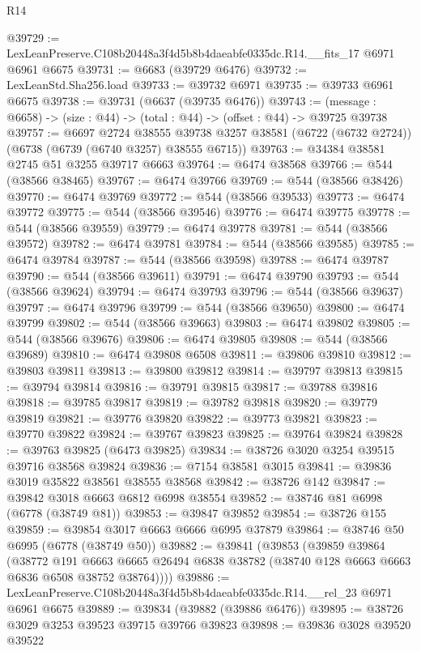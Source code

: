\begin{lexlean}{R14}
\begin{coremodule}
@39729 := LexLeanPreserve.C108b20448a3f4d5b8b4daeabfe0335dc.R14.__fits_17 @6971 @6961 @6675
@39731 := @6683 (@39729 @6476)
@39732 := LexLeanStd.Sha256.load
@39733 := @39732 @6971
@39735 := @39733 @6961 @6675
@39738 := @39731 (@6637 (@39735 @6476))
@39743 := (message : @6658) -> (size : @44) -> (total : @44) -> (offset : @44) -> @39725 @39738
@39757 := @6697
    @2724
    @38555
    @39738
    @3257
    @38581
    (@6722 (@6732 @2724))
    (@6738 (@6739 (@6740 @3257) @38555 @6715))
@39763 := @34384 @38581 @2745 @51 @3255 @39717 @6663
@39764 := @6474 @38568
@39766 := @544 (@38566 @38465)
@39767 := @6474 @39766
@39769 := @544 (@38566 @38426)
@39770 := @6474 @39769
@39772 := @544 (@38566 @39533)
@39773 := @6474 @39772
@39775 := @544 (@38566 @39546)
@39776 := @6474 @39775
@39778 := @544 (@38566 @39559)
@39779 := @6474 @39778
@39781 := @544 (@38566 @39572)
@39782 := @6474 @39781
@39784 := @544 (@38566 @39585)
@39785 := @6474 @39784
@39787 := @544 (@38566 @39598)
@39788 := @6474 @39787
@39790 := @544 (@38566 @39611)
@39791 := @6474 @39790
@39793 := @544 (@38566 @39624)
@39794 := @6474 @39793
@39796 := @544 (@38566 @39637)
@39797 := @6474 @39796
@39799 := @544 (@38566 @39650)
@39800 := @6474 @39799
@39802 := @544 (@38566 @39663)
@39803 := @6474 @39802
@39805 := @544 (@38566 @39676)
@39806 := @6474 @39805
@39808 := @544 (@38566 @39689)
@39810 := @6474 @39808 @6508
@39811 := @39806 @39810
@39812 := @39803 @39811
@39813 := @39800 @39812
@39814 := @39797 @39813
@39815 := @39794 @39814
@39816 := @39791 @39815
@39817 := @39788 @39816
@39818 := @39785 @39817
@39819 := @39782 @39818
@39820 := @39779 @39819
@39821 := @39776 @39820
@39822 := @39773 @39821
@39823 := @39770 @39822
@39824 := @39767 @39823
@39825 := @39764 @39824
@39828 := @39763 @39825 (@6473 @39825)
@39834 := @38726 @3020 @3254 @39515 @39716 @38568 @39824
@39836 := @7154 @38581 @3015
@39841 := @39836 @3019 @35822 @38561 @38555 @38568
@39842 := @38726 @142
@39847 := @39842 @3018 @6663 @6812 @6998 @38554
@39852 := @38746 @81 @6998 (@6778 (@38749 @81))
@39853 := @39847 @39852
@39854 := @38726 @155
@39859 := @39854 @3017 @6663 @6666 @6995 @37879
@39864 := @38746 @50 @6995 (@6778 (@38749 @50))
@39882 := @39841
    (@39853
      (@39859
        @39864
        (@38772
          @191
          @6663
          @6665
          @26494
          @6838
          @38782
          (@38740 @128 @6663 @6663 @6836 @6508 @38752 @38764))))
@39886 := LexLeanPreserve.C108b20448a3f4d5b8b4daeabfe0335dc.R14.__rel_23 @6971 @6961 @6675
@39889 := @39834 (@39882 (@39886 @6476))
@39895 := @38726 @3029 @3253 @39523 @39715 @39766 @39823
@39898 := @39836 @3028 @39520 @39522

\end{coremodule}
\end{lexlean}

